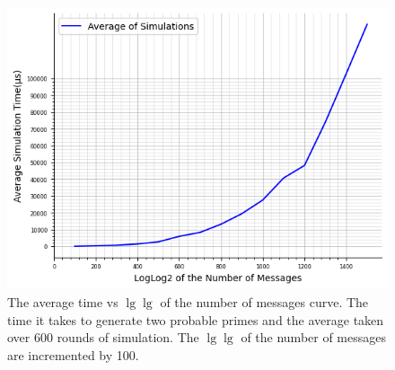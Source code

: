 \begin{figure}
	\includegraphics*[height = 0.4 \textheight]{graphic/time26.png}
	\caption{The average time vs \(\lg \lg \) of the number of messages curve. The time it takes to generate two probable primes and the average taken over 600 rounds of simulation. The \(\lg \lg \) of the number of messages are incremented by 100.}
\end{figure}
\newpage